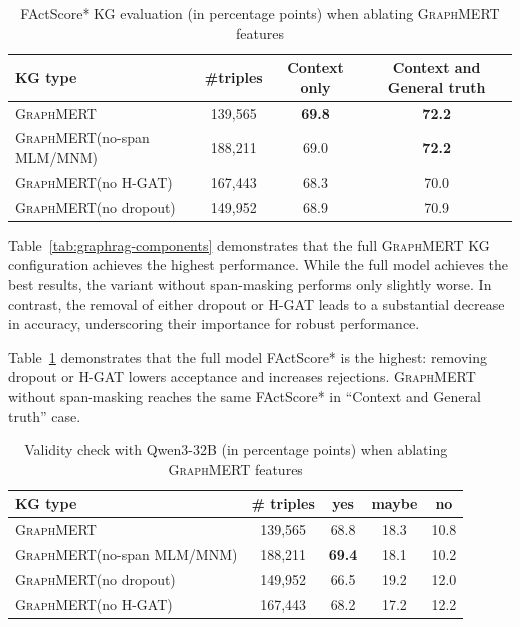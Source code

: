 \documentclass[10pt]{article}
\newcommand{\ours}{\textsc{GraphMERT}\xspace}
\begin{document}
\begin{table}[t!]
  \centering
  \caption{FActScore* KG evaluation (in percentage points) when ablating \ours features}
  \label{tab:factscore_arch_ablation}
  \small
  \begingroup
  \setlength{\tabcolsep}{6pt}
  \begin{tabular}{l c c c}
    \toprule
    \rowcolor{gray!30}
    \textbf{KG type} &
    \textbf{\#triples} &
    \textbf{Context only} &
    \textbf{Context and General truth} \\
    \midrule
    \ours & 139,565 & \textbf{69.8} & \textbf{72.2} \\
    \midrule
    \ours (no-span MLM/MNM) & 188,211 & 69.0 & \textbf{72.2} \\
    \ours (no H-GAT) & 167,443 & 68.3 & 70.0 \\
    \ours (no dropout) & 149,952 & 68.9 & 70.9 \\
    \bottomrule
  \end{tabular}
  \endgroup
\end{table}

Table~\ref{tab:graphrag-components} demonstrates that the full \ours KG configuration achieves the highest performance. While the full model achieves the best results, the variant without span-masking performs only slightly worse. In contrast, the removal of either dropout or H-GAT leads to a substantial decrease in accuracy, underscoring their importance for robust performance.

Table~\ref{tab:factscore_arch_ablation} demonstrates that the full model FActScore* is the highest: removing dropout or H-GAT lowers acceptance and increases rejections. \ours without span-masking reaches the same FActScore* in ``Context and General truth'' case.


\begin{table}[t!]
  \centering
  \caption{Validity check with Qwen3-32B (in percentage points) when ablating \ours features}
  \label{tab:validity_arch_ablation}
  \small
  \begingroup
  \setlength{\tabcolsep}{6pt}
  \begin{tabular}{l c c c c}
    \toprule
    \rowcolor{gray!30}
    \textbf{KG type} &
    \textbf{\# triples} &
    \textbf{yes} &
    \textbf{maybe} &
    \textbf{no}
    \\
    \midrule
    \ours  & 139,565 & 68.8 & 18.3 & 10.8 \\
    \midrule
    \ours (no-span MLM/MNM) & 188,211 & \textbf{69.4} & 18.1 & 10.2 \\
    \ours (no dropout) & 149,952 & 66.5 & 19.2 & 12.0 \\
    \ours (no H-GAT) & 167,443 & 68.2 & 17.2 & 12.2 \\
    \bottomrule
  \end{tabular}
  \endgroup
\end{table}
\end{document}
